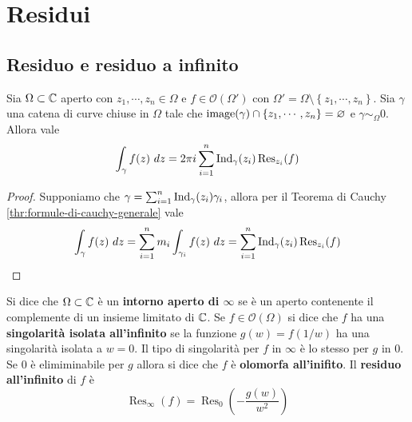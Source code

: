\def \Res {\operatorname{Res}}

\chapter{Residui}

\section{Residuo e residuo a infinito}

\begin{theorem}
  Sia $\Omega \subset \mathbb{C}$ aperto con $z_1, \cdots, z_n \in \Omega$ e $f \in
  \mathcal{O}(\Omega')$ con $\Omega' = \Omega \setminus \left\{ z_1,\cdots, z_n
  \right\}$. Sia $\gamma$ una catena di curve chiuse in $\Omega$ tale che
  $\operatorname{image}(\gamma) \cap \left\{ z_1, \cdots,z_n \right\} = \varnothing$ e $\gamma
  \sim_\Omega 0$. Allora vale 
  \begin{equation*}
    \int_\gamma f(z)\ dz = 2 \pi i \sum_{i=1}^{n} \Ind_\gamma(z_i)
    \Res_{z_i}(f)
  \end{equation*}
  \label{thr:teorema_dei_residui}
\end{theorem}
\begin{proof}
  Supponiamo che $\gamma = \sum_{i=1}^n \operatorname{Ind}_\gamma (z_i) \gamma_i$, allora
  per il Teorema di Cauchy \ref{thr:formule-di-cauchy-generale} vale 
  \begin{equation*}
    \int_\gamma f(z) \ dz = \sum_{i = 1}^{n} m_i \int_{\gamma_i} f(z) \ dz
    = \sum_{i=1}^n \Ind_\gamma(z_i) \Res_{z_i}(f)
  \end{equation*}
\end{proof}

\begin{definition}
  Si dice che $\Omega \subset \mathbb{C}$ è un \textbf{intorno aperto di $\infty$} se
  è un aperto contenente il complemente di un insieme limitato di $\mathbb{C}$. Se $f
  \in \mathcal{O}(\Omega)$ si dice che $f$ ha una \textbf{singolarità isolata
  all'infinito} se la funzione $g(w) = f(1/w)$ ha una singolarità isolata a $w
  = 0$. Il tipo di singolarità per $f$ in $\infty$ è lo stesso per $g$ in $0$.
  Se $0$ è elimiminabile per $g$ allora si dice che $f$ è \textbf{olomorfa
  all'inifito}. Il \textbf{residuo all'infinito} di $f$ è 
  \begin{equation*}
    \Res_\infty(f) = \Res_0\left( -\frac{g(w)}{w^2} \right)
  \end{equation*}
  \label{def:varie_definizioni_all'inifinito}
\end{definition}

